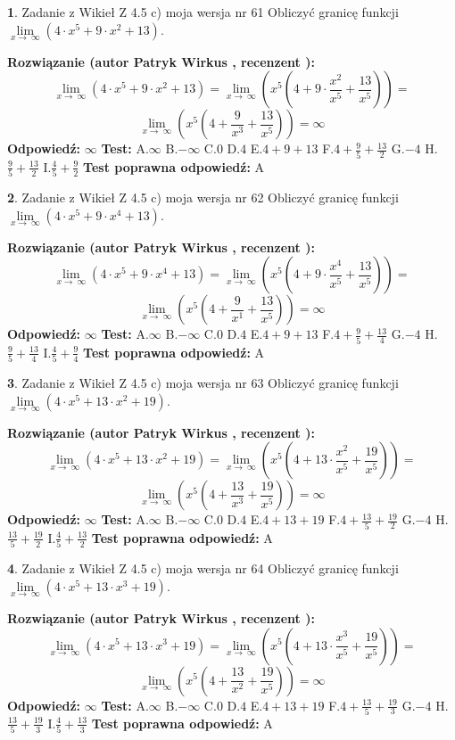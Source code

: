 \documentclass[12pt, a4paper]{article}
\theoremstyle{definition} %
\newtheorem{zad}{}
\newcommand{\zadStart}[1]{\begin{zad}#1\newline}
\newcommand{\zadStop}{\end{zad}}
\newcommand{\rozwStart}[2]{\noindent \textbf{Rozwiązanie (autor #1 , recenzent #2): }\newline}
\newcommand{\rozwStop}{\newline}
\newcommand{\odpStart}{\noindent \textbf{Odpowiedź:}\newline}
\newcommand{\odpStop}{\newline}
\newcommand{\testStart}{\noindent \textbf{Test:}\newline}
\newcommand{\testStop}{\newline}
\newcommand{\kluczStart}{\noindent \textbf{Test poprawna odpowiedź:}\newline}
\newcommand{\kluczStop}{\newline}
\begin{document}
\zadStart{Zadanie z Wikieł Z 4.5 c) moja wersja nr 61}
Obliczyć granicę funkcji  $\lim\limits_{x\to\ \infty}(4 \cdot x^{5}+9 \cdot x^{2}+13)$.
\zadStop
\rozwStart{Patryk Wirkus}{}
$$\lim\limits_{x\to\ \infty}(4 \cdot x^{5}+9 \cdot x^{2}+13) = \lim\limits_{x\to\ \infty}(x^{5}(4 +9 \cdot \frac{x^{2}}{x^{5}}+\frac{13}{x^{5}})) =$$ $$\lim\limits_{x\to\ \infty}(x^{5}(4 +\frac{9}{x^{3}}+\frac{13}{x^{5}})) =\infty$$
\rozwStop
\odpStart
$\infty$
\odpStop
\testStart
A.$\infty$ B.$-\infty$ C.$0$ D.$4$ E.$4 + 9 + 13$
F.$4+\frac{9}{5}+\frac{13}{2}$ G.$-4$
H.$\frac{9}{5}+\frac{13}{2}$
I.$\frac{4}{5}+\frac{9}{2}$
\testStop
\kluczStart
A
\kluczStop



\zadStart{Zadanie z Wikieł Z 4.5 c) moja wersja nr 62}
Obliczyć granicę funkcji  $\lim\limits_{x\to\ \infty}(4 \cdot x^{5}+9 \cdot x^{4}+13)$.
\zadStop
\rozwStart{Patryk Wirkus}{}
$$\lim\limits_{x\to\ \infty}(4 \cdot x^{5}+9 \cdot x^{4}+13) = \lim\limits_{x\to\ \infty}(x^{5}(4 +9 \cdot \frac{x^{4}}{x^{5}}+\frac{13}{x^{5}})) =$$ $$\lim\limits_{x\to\ \infty}(x^{5}(4 +\frac{9}{x^{1}}+\frac{13}{x^{5}})) =\infty$$
\rozwStop
\odpStart
$\infty$
\odpStop
\testStart
A.$\infty$ B.$-\infty$ C.$0$ D.$4$ E.$4 + 9 + 13$
F.$4+\frac{9}{5}+\frac{13}{4}$ G.$-4$
H.$\frac{9}{5}+\frac{13}{4}$
I.$\frac{4}{5}+\frac{9}{4}$
\testStop
\kluczStart
A
\kluczStop



\zadStart{Zadanie z Wikieł Z 4.5 c) moja wersja nr 63}
Obliczyć granicę funkcji  $\lim\limits_{x\to\ \infty}(4 \cdot x^{5}+13 \cdot x^{2}+19)$.
\zadStop
\rozwStart{Patryk Wirkus}{}
$$\lim\limits_{x\to\ \infty}(4 \cdot x^{5}+13 \cdot x^{2}+19) = \lim\limits_{x\to\ \infty}(x^{5}(4 +13 \cdot \frac{x^{2}}{x^{5}}+\frac{19}{x^{5}})) =$$ $$\lim\limits_{x\to\ \infty}(x^{5}(4 +\frac{13}{x^{3}}+\frac{19}{x^{5}})) =\infty$$
\rozwStop
\odpStart
$\infty$
\odpStop
\testStart
A.$\infty$ B.$-\infty$ C.$0$ D.$4$ E.$4 + 13 + 19$
F.$4+\frac{13}{5}+\frac{19}{2}$ G.$-4$
H.$\frac{13}{5}+\frac{19}{2}$
I.$\frac{4}{5}+\frac{13}{2}$
\testStop
\kluczStart
A
\kluczStop



\zadStart{Zadanie z Wikieł Z 4.5 c) moja wersja nr 64}
Obliczyć granicę funkcji  $\lim\limits_{x\to\ \infty}(4 \cdot x^{5}+13 \cdot x^{3}+19)$.
\zadStop
\rozwStart{Patryk Wirkus}{}
$$\lim\limits_{x\to\ \infty}(4 \cdot x^{5}+13 \cdot x^{3}+19) = \lim\limits_{x\to\ \infty}(x^{5}(4 +13 \cdot \frac{x^{3}}{x^{5}}+\frac{19}{x^{5}})) =$$ $$\lim\limits_{x\to\ \infty}(x^{5}(4 +\frac{13}{x^{2}}+\frac{19}{x^{5}})) =\infty$$
\rozwStop
\odpStart
$\infty$
\odpStop
\testStart
A.$\infty$ B.$-\infty$ C.$0$ D.$4$ E.$4 + 13 + 19$
F.$4+\frac{13}{5}+\frac{19}{3}$ G.$-4$
H.$\frac{13}{5}+\frac{19}{3}$
I.$\frac{4}{5}+\frac{13}{3}$
\testStop
\kluczStart
A
\kluczStop
\end{document}
